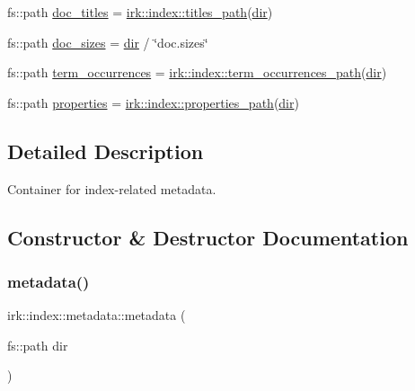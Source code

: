 \begin{DoxyCompactItemize}
\item 
fs\+::path \mbox{\hyperlink{structirk_1_1index_1_1metadata_aae05b9d0a33fd6c90f7f9be0a359ca77}{doc\+\_\+titles}} = \mbox{\hyperlink{namespaceirk_1_1index_a2c4aa814da3f9412179fe44a70fdbe94}{irk\+::index\+::titles\+\_\+path}}(\mbox{\hyperlink{structirk_1_1index_1_1metadata_a355b4325c022cd152e68fc18b1775fc6}{dir}})
\item 
fs\+::path \mbox{\hyperlink{structirk_1_1index_1_1metadata_a7aa4d97e4e11c582380ad03e18eb62bb}{doc\+\_\+sizes}} = \mbox{\hyperlink{structirk_1_1index_1_1metadata_a355b4325c022cd152e68fc18b1775fc6}{dir}} / \char`\"{}doc.\+sizes\char`\"{}
\item 
fs\+::path \mbox{\hyperlink{structirk_1_1index_1_1metadata_a9abaf09f8e29f9be71171242db8839ec}{term\+\_\+occurrences}} = \mbox{\hyperlink{namespaceirk_1_1index_a1cd8d96d17fa744fdcc7cb3321b4dd25}{irk\+::index\+::term\+\_\+occurrences\+\_\+path}}(\mbox{\hyperlink{structirk_1_1index_1_1metadata_a355b4325c022cd152e68fc18b1775fc6}{dir}})
\item 
fs\+::path \mbox{\hyperlink{structirk_1_1index_1_1metadata_a1501ec5d527da04b74af747230504ee0}{properties}} = \mbox{\hyperlink{namespaceirk_1_1index_a5880f03dd72d6ebbae004d2ab83c219e}{irk\+::index\+::properties\+\_\+path}}(\mbox{\hyperlink{structirk_1_1index_1_1metadata_a355b4325c022cd152e68fc18b1775fc6}{dir}})
\end{DoxyCompactItemize}


\subsection{Detailed Description}
Container for index-\/related metadata. 

\subsection{Constructor \& Destructor Documentation}
\mbox{\label{structirk_1_1index_1_1metadata_a9d0e997a5145a95328519290af96326c}} 
\subsubsection{\texorpdfstring{metadata()}{metadata()}}
{\footnotesize\ttfamily irk\+::index\+::metadata\+::metadata (\begin{DoxyParamCaption}\item[{fs\+::path}]{dir }\end{DoxyParamCaption})\hspace{0.3cm}{\ttfamily [inline]}}



